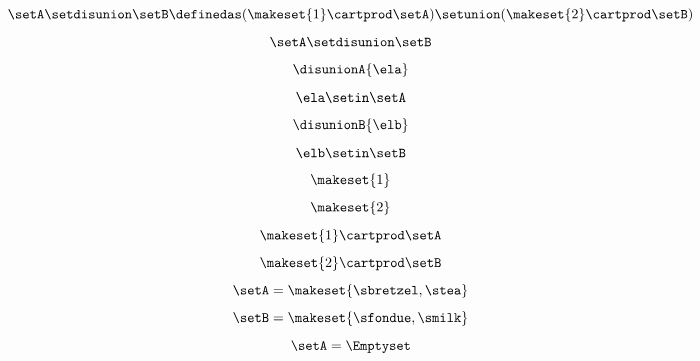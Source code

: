 \begin{forslides}
    \begin{equation}
        \label{eq:slides_session2_59}
        \setA \setdisunion \setB \definedas (  \makeset{ 1 } \cartprod \setA) \setunion ( \makeset{2}  \cartprod \setB)
    \end{equation}
    \begin{equation}
        \label{eq:slides_session2_60}
        \setA \setdisunion \setB
    \end{equation}
    \begin{equation}
        \label{eq:slides_session2_61}
        \disunionA{\ela}
    \end{equation}
    \begin{equation}
        \label{eq:slides_session2_62}
        \ela \setin\setA
    \end{equation}
    \begin{equation}
        \label{eq:slides_session2_63}
        \disunionB{\elb}
    \end{equation}
    \begin{equation}
        \label{eq:slides_session2_64}
        \elb \setin\setB
    \end{equation}
    \begin{equation}
        \label{eq:slides_session2_65}
        \makeset{ 1 }
    \end{equation}
    \begin{equation}
        \label{eq:slides_session2_66}
        \makeset{2}
    \end{equation}
    \begin{equation}
        \label{eq:slides_session2_67}
        \makeset{ 1 }  \cartprod \setA
    \end{equation}
    \begin{equation}
        \label{eq:slides_session2_68}
        \makeset{2}  \cartprod \setB
    \end{equation}
    \begin{equation}
        \label{eq:slides_session2_69}
        \setA=\makeset{\sbretzel, \stea}
    \end{equation}
    \begin{equation}
        \label{eq:slides_session2_70}
        \setB=\makeset{\sfondue, \smilk}
    \end{equation}
    \begin{equation}
        \label{eq:slides_session2_71}
        \setA = \Emptyset
    \end{equation}
    \begin{equation}
        \label{eq:slides_session2_72}

\end{equation}
\end{forslides}
